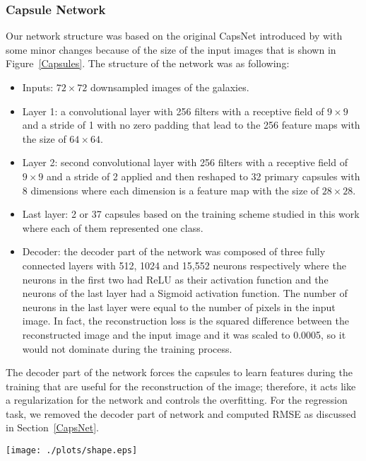 \documentclass[a4paper,fleqn,usenatbib]{mnras}
\begin{document}
\subsubsection{Capsule Network}
Our network structure was based on the original CapsNet introduced by \cite{sabour2017dynamic} with some minor changes because of the size of the input images that is shown in Figure~\ref{Capsules}. The structure of the network was as following:
\begin{itemize}
	\item{Inputs:} $72 \times 72$ downsampled images of the galaxies.
	\item{Layer 1:} a convolutional layer with 256 filters with a receptive field of $9\times9$ and a stride of 1 with no zero padding that lead to the 256 feature maps with the size of $64 \times 64$.
	\item{Layer 2:} second convolutional layer with 256 filters with a receptive field of $9\times9$ and a stride of 2 applied and then reshaped to 32 primary capsules with 8 dimensions where each dimension is a feature map with the size of $28 \times 28$.
	\item{Last layer:} 2 or 37 capsules based on the training scheme studied in this work where each of them represented one class.
	\item{Decoder:} the decoder part of the network was composed of three fully connected layers with 512, 1024 and 15,552 neurons respectively where the neurons in the first two had ReLU as their activation function and the neurons of the last layer had a Sigmoid activation function. The number of neurons in the last layer were equal to the number of pixels in the input image. In fact, the reconstruction loss is the squared difference between the reconstructed image and the input image and it was scaled to 0.0005, so it would not dominate during the training process. 
\end{itemize}

The decoder part of the network forces the capsules to learn features during the training that are useful for the reconstruction of the image; therefore, it acts like a regularization for the network and controls the overfitting. For the regression task, we removed the decoder part of network and computed RMSE as discussed in Section~\ref{CapsNet}.

\begin{figure*}
	\texttt{[image: ./plots/shape.eps]}
    \caption{The architecture of the model used in this work. \textit{Top:} represents architecture of the capsule layers where the GalaxCap layer has 2 or 37 capsules based on the different setups discussed in Section \ref{arc}. \textit{Bottom:} represents the structure of the decoder that acts as regularization during the training}
    \label{Capsules}
\end{figure*}
\end{document}
